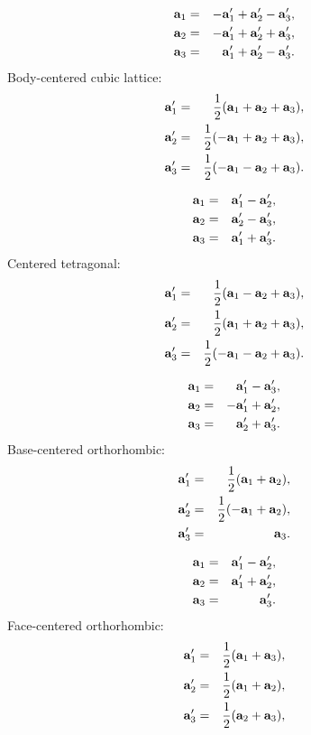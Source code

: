 \documentclass[12pt,a4paper,twoside]{report}
\begin{document}
\begin{eqnarray}
{\bf a}_1&=& -{\bf a}_1' + {\bf a}_2'- {\bf a}_3', \\
{\bf a}_2&=& -{\bf a}_1' + {\bf a}_2'+ {\bf a}_3', \\
{\bf a}_3&=& {\bf a}_1' + {\bf a}_2'- {\bf a}_3' .
\end{eqnarray}
Body-centered cubic lattice:
\begin{eqnarray}
{\bf a}_1'&=&{1\over 2} ({\bf a}_1 + {\bf a}_2 + {\bf a}_3), \\
{\bf a}_2'&=&{1\over 2} (-{\bf a}_1 + {\bf a}_2 + {\bf a}_3), \\
{\bf a}_3'&=&{1\over 2} (-{\bf a}_1 - {\bf a}_2 + {\bf a}_3). 
\end{eqnarray}

\begin{eqnarray}
{\bf a}_1&=&  {\bf a}_1' - {\bf a}_2', \\
{\bf a}_2&=&  {\bf a}_2' - {\bf a}_3', \\
{\bf a}_3&=& {\bf a}_1' + {\bf a}_3'.
\end{eqnarray}
Centered tetragonal:
\begin{eqnarray}
{\bf a}_1'&=&{1\over 2} ({\bf a}_1 - {\bf a}_2 + {\bf a}_3), \\
{\bf a}_2'&=&{1\over 2} ({\bf a}_1 + {\bf a}_2 + {\bf a}_3), \\
{\bf a}_3'&=&{1\over 2} (-{\bf a}_1 - {\bf a}_2 + {\bf a}_3). 
\end{eqnarray}

\begin{eqnarray}
{\bf a}_1&=&  {\bf a}_1' - {\bf a}_3', \\
{\bf a}_2&=& -{\bf a}_1' + {\bf a}_2', \\
{\bf a}_3&=& {\bf a}_2' + {\bf a}_3'.
\end{eqnarray}
Base-centered orthorhombic:
\begin{eqnarray}
{\bf a}_1'&=&{1\over 2} ({\bf a}_1 + {\bf a}_2), \\
{\bf a}_2'&=&{1\over 2} (-{\bf a}_1 + {\bf a}_2), \\
{\bf a}_3'&=&{\bf a}_3. 
\end{eqnarray}

\begin{eqnarray}
{\bf a}_1&=&  {\bf a}_1' - {\bf a}_2', \\
{\bf a}_2&=&  {\bf a}_1' + {\bf a}_2', \\
{\bf a}_3&=& {\bf a}_3'.
\end{eqnarray}
Face-centered orthorhombic:
\begin{eqnarray}
{\bf a}_1'&=&{1\over 2} ({\bf a}_1 + {\bf a}_3), \\
{\bf a}_2'&=&{1\over 2} ({\bf a}_1 + {\bf a}_2), \\
{\bf a}_3'&=&{1\over 2} ({\bf a}_2 + {\bf a}_3), \\
\end{eqnarray}
\end{document}
